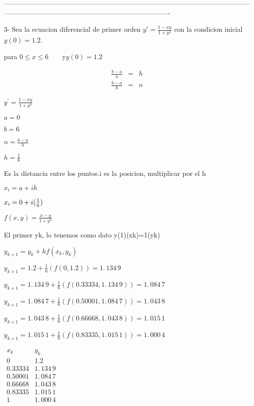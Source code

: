 \documentclass{article}
\begin{document}
\bigskip
-------------------------------------------------------------------------------------------------------------------------------------------------------------------------------------

3- Sea la ecuacion diferencial de primer orden $y\prime =\frac{1-xy}{1+y^{4}}
$ con la condicion inicial $y(0)=1.2$.

para \qquad $0\leq x\leq 6\qquad $y\qquad $y(0)=1.2$

\begin{eqnarray*}
\frac{b-a}{n} &=&h \\
\frac{b-a}{h} &=&n
\end{eqnarray*}

$y^{\prime }=\frac{1-xy}{1+y^{4}}$

$a=0$

$b=6$

$n=\frac{b-a}{h}$

$h=\frac{1}{6}$

Es la distancia entre los puntos.i es la posicion, multiplicar por el h

$x_{i}=a+ih$

$\bigskip x_{i}=0+i(\frac{1}{6})$

\bigskip $f(x,y)=\frac{x-y}{1+y^{4}}$

El primer yk, lo tenemos como dato y(1)(xk)=1(yk)

$y_{k+1}=y_{k}+hf(x_{k},y_{k})$

$y_{k+1}=1.2+\frac{1}{6}(f(0,1.2))=\allowbreak 1.\,\allowbreak 134\,9$

$y_{k+1}=1.\,\allowbreak 134\,9+\frac{1}{6}(f(0.33334,1.\,\allowbreak
134\,9))=\allowbreak 1.\,\allowbreak 084\,7$

$y_{k+1}=1.\,\allowbreak 084\,7+\frac{1}{6}(f(0.50001,1.\,\allowbreak
084\,7))=\allowbreak 1.\,\allowbreak 043\,8$

$y_{k+1}=\allowbreak 1.\,\allowbreak 043\,8+\frac{1}{6}(f(0.66668,1.\,%
\allowbreak 043\,8))=\allowbreak 1.\,\allowbreak 015\,1$

$y_{k+1}=\allowbreak \allowbreak 1.\,\allowbreak 015\,1+\frac{1}{6}%
(f(0.83335,\allowbreak 1.\,\allowbreak 015\,1))=\allowbreak 1.\,\allowbreak
000\,4$

$%
\begin{array}{cc}
x_{k} & y_{k} \\ 
0 & 1.2 \\ 
0.33334 & \allowbreak 1.\,\allowbreak 134\,9 \\ 
0.50001 & \allowbreak 1.\,\allowbreak 084\,7 \\ 
0.66668 & \allowbreak 1.\,\allowbreak 043\,8 \\ 
0.83335 & 1.\,\allowbreak 015\,1 \\ 
1 & \allowbreak \allowbreak 1.\,\allowbreak 000\,4%
\end{array}%
$
\end{document}
